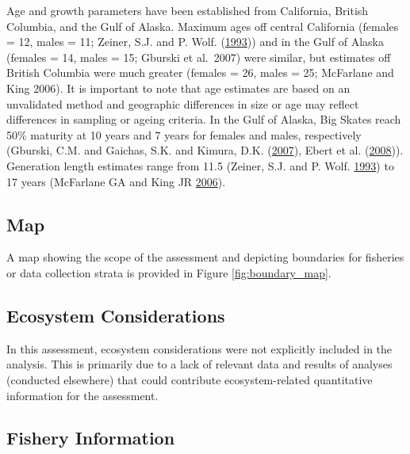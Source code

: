 \documentclass[12pt,]{article}
\begin{document}
Age and growth parameters have been established from California, British
Columbia, and the Gulf of Alaska. Maximum ages off central California
(females = 12, males = 11; Zeiner, S.J. and P. Wolf.
(\protect\hyperlink{ref-ZeinerWolf1993}{1993})) and in the Gulf of
Alaska (females = 14, males = 15; Gburski et al.~2007) were similar, but
estimates off British Columbia were much greater (females = 26, males =
25; McFarlane and King 2006). It is important to note that age estimates
are based on an unvalidated method and geographic differences in size or
age may reflect differences in sampling or ageing criteria. In the Gulf
of Alaska, Big Skates reach 50\% maturity at 10 years and 7 years for
females and males, respectively (Gburski, C.M. and Gaichas, S.K. and
Kimura, D.K. (\protect\hyperlink{ref-Gburski2007}{2007}), Ebert et al.
(\protect\hyperlink{ref-Ebert2008}{2008})). Generation length estimates
range from 11.5 (Zeiner, S.J. and P. Wolf.
\protect\hyperlink{ref-ZeinerWolf1993}{1993}) to 17 years (McFarlane GA
and King JR \protect\hyperlink{ref-McFandKing2006}{2006}).

\begin{landscape}


\end{landscape}

\hypertarget{map}{%
\subsection{Map}\label{map}}

A map showing the scope of the assessment and depicting boundaries for
fisheries or data collection strata is provided in Figure
\ref{fig:boundary_map}.

\hypertarget{ecosystem-considerations-1}{%
\subsection{Ecosystem Considerations}\label{ecosystem-considerations-1}}

In this assessment, ecosystem considerations were not explicitly
included in the analysis. This is primarily due to a lack of relevant
data and results of analyses (conducted elsewhere) that could contribute
ecosystem-related quantitative information for the assessment.

\hypertarget{fishery-information}{%
\subsection{Fishery Information}\label{fishery-information}}
\end{document}
